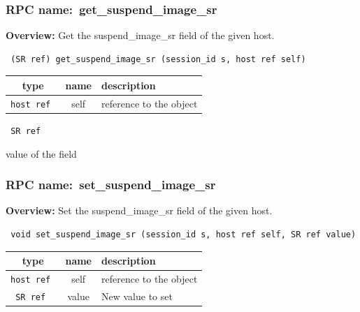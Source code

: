 \subsubsection{RPC name:~get\_suspend\_image\_sr}

{\bf Overview:} 
Get the suspend\_image\_sr field of the given host.

\begin{verbatim} (SR ref) get_suspend_image_sr (session_id s, host ref self)\end{verbatim}



 
\vspace{0.3cm}
\begin{tabular}{|c|c|p{7cm}|}
 \hline
{\bf type} & {\bf name} & {\bf description} \\ \hline
{\tt host ref } & self & reference to the object \\ \hline 

\end{tabular}

\vspace{0.3cm}

{\tt 
SR ref
}


value of the field
\vspace{0.3cm}
\vspace{0.3cm}
\vspace{0.3cm}
\subsubsection{RPC name:~set\_suspend\_image\_sr}

{\bf Overview:} 
Set the suspend\_image\_sr field of the given host.

\begin{verbatim} void set_suspend_image_sr (session_id s, host ref self, SR ref value)\end{verbatim}



 
\vspace{0.3cm}
\begin{tabular}{|c|c|p{7cm}|}
 \hline
{\bf type} & {\bf name} & {\bf description} \\ \hline
{\tt host ref } & self & reference to the object \\ \hline 

{\tt SR ref } & value & New value to set \\ \hline 

\end{tabular}

